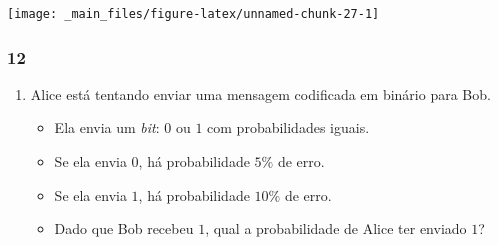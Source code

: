 \documentclass[
  11pt]{report}
\begin{document}
\begin{center}\texttt{[image: \_main\_files/figure-latex/unnamed-chunk-27-1]} \end{center}

\hypertarget{section-12}{%
\subsubsection*{12}\label{section-12}}

\begin{rmdbox}

\begin{enumerate}
\def\labelenumi{\alph{enumi}.}
\item
  Alice está tentando enviar uma mensagem codificada em binário para Bob.

  \begin{itemize}
  \item
    Ela envia um \emph{bit}: $0$ ou $1$ com probabilidades iguais.
  \item
    Se ela envia $0$, há probabilidade $5\%$ de erro.
  \item
    Se ela envia $1$, há probabilidade $10\%$ de erro.
  \item
    Dado que Bob recebeu $1$, qual a probabilidade de Alice ter enviado $1$?
  \end{itemize}
\end{enumerate}

\end{rmdbox}
\end{document}
